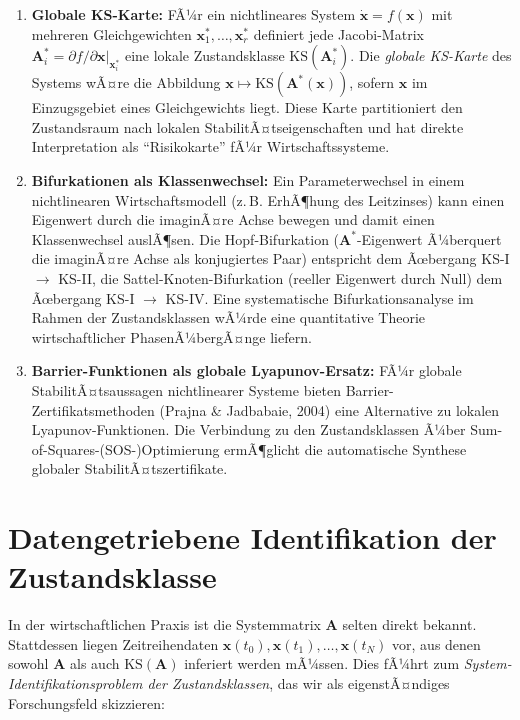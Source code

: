 ﻿\documentclass[12pt, a4paper, titlepage]{report}
\theoremstyle{definition}
\theoremstyle{remark}
\newcommand{\vx}{\bm{x}}
\newcommand{\vA}{\bm{A}}
\newcommand{\KS}{\mathrm{KS}}
\begin{document}
\begin{enumerate}[label=\textbf{A\arabic*.}]
  \item \textbf{Globale KS-Karte:} FÃ¼r ein nichtlineares System $\dot{\vx} = f(\vx)$
    mit mehreren Gleichgewichten $\vx_1^*, \ldots, \vx_r^*$ definiert jede
    Jacobi-Matrix $\vA_i^* = \partial f/\partial\vx|_{\vx_i^*}$ eine lokale
    Zustandsklasse $\KS(\vA_i^*)$. Die \emph{globale KS-Karte} des Systems wÃ¤re
    die Abbildung $\vx \mapsto \KS(\vA^*(\vx))$, sofern $\vx$ im Einzugsgebiet
    eines Gleichgewichts liegt. Diese Karte partitioniert den Zustandsraum nach
    lokalen StabilitÃ¤tseigenschaften und hat direkte Interpretation als ``Risikokarte''
    fÃ¼r Wirtschaftssysteme.

  \item \textbf{Bifurkationen als Klassenwechsel:} Ein Parameterwechsel in einem
    nichtlinearen Wirtschaftsmodell (z.\,B. ErhÃ¶hung des Leitzinses) kann einen
    Eigenwert durch die imaginÃ¤re Achse bewegen und damit einen Klassenwechsel
    auslÃ¶sen. Die Hopf-Bifurkation ($\vA^*$-Eigenwert Ã¼berquert die imaginÃ¤re Achse
    als konjugiertes Paar) entspricht dem Ãœbergang KS-I $\to$ KS-II, die
    Sattel-Knoten-Bifurkation (reeller Eigenwert durch Null) dem Ãœbergang KS-I $\to$ KS-IV.
    Eine systematische Bifurkationsanalyse im Rahmen der Zustandsklassen wÃ¼rde eine
    quantitative Theorie wirtschaftlicher PhasenÃ¼bergÃ¤nge liefern.

  \item \textbf{Barrier-Funktionen als globale Lyapunov-Ersatz:} FÃ¼r globale
    StabilitÃ¤tsaussagen nichtlinearer Systeme bieten Barrier-Zertifikatsmethoden
    (Prajna \& Jadbabaie, 2004) eine Alternative zu lokalen Lyapunov-Funktionen.
    Die Verbindung zu den Zustandsklassen Ã¼ber Sum-of-Squares-(SOS-)Optimierung
    ermÃ¶glicht die automatische Synthese globaler StabilitÃ¤tszertifikate.
\end{enumerate}

\section{Datengetriebene Identifikation der Zustandsklasse}
\label{subsec:datengetrieben}

In der wirtschaftlichen Praxis ist die Systemmatrix $\vA$ selten direkt bekannt.
Stattdessen liegen Zeitreihendaten $\vx(t_0), \vx(t_1), \ldots, \vx(t_N)$ vor,
aus denen sowohl $\vA$ als auch $\KS(\vA)$ inferiert werden mÃ¼ssen. Dies fÃ¼hrt zum
\emph{System-Identifikationsproblem der Zustandsklassen}, das wir als
eigenstÃ¤ndiges Forschungsfeld skizzieren:
\end{document}
